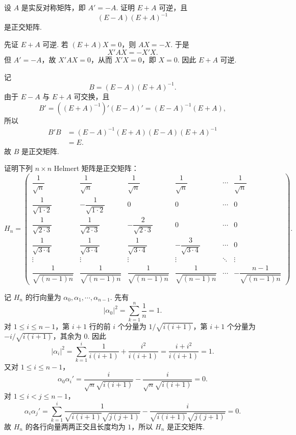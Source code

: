 \begin{problem}

	设 $A$ 是实反对称矩阵，即 $A'=-A$. 证明 $E+A$ 可逆，且
	\[
	(E-A)(E+A)^{-1}
	\]
	是正交矩阵.
\end{problem}
\begin{solution}
	先证 $E+A$ 可逆. 若 $(E+A)X=0$，则 $AX=-X$. 于是
	\[
	X'AX=-X'X.
	\]
	但 $A'=-A$，故 $X'AX=0$，从而 $X'X=0$，即 $X=0$. 因此 $E+A$ 可逆.
	
	记
	\[
	B=(E-A)(E+A)^{-1}.
	\]
	由于 $E-A$ 与 $E+A$ 可交换，且
	\[
	B'=\left((E+A)^{-1}\right)'(E-A)'=(E-A)^{-1}(E+A),
	\]
	所以
	\[
	\begin{aligned}
		B'B
		&=(E-A)^{-1}(E+A)(E-A)(E+A)^{-1} \\
		&=E.
	\end{aligned}
	\]
	故 $B$ 是正交矩阵.
\end{solution}

\begin{problem}

	证明下列 $n\times n$ Helmert 矩阵是正交矩阵：
	\[
	H_n=
	\begin{pmatrix}
		\dfrac1{\sqrt n} & \dfrac1{\sqrt n} & \dfrac1{\sqrt n} & \dfrac1{\sqrt n} & \cdots & \dfrac1{\sqrt n} \\
		\dfrac1{\sqrt{1\cdot2}} & -\dfrac1{\sqrt{1\cdot2}} & 0 & 0 & \cdots & 0 \\
		\dfrac1{\sqrt{2\cdot3}} & \dfrac1{\sqrt{2\cdot3}} & -\dfrac2{\sqrt{2\cdot3}} & 0 & \cdots & 0 \\
		\dfrac1{\sqrt{3\cdot4}} & \dfrac1{\sqrt{3\cdot4}} & \dfrac1{\sqrt{3\cdot4}} & -\dfrac3{\sqrt{3\cdot4}} & \cdots & 0 \\
		\vdots & \vdots & \vdots & \vdots & \ddots & \vdots \\
		\dfrac1{\sqrt{(n-1)n}} & \dfrac1{\sqrt{(n-1)n}} & \dfrac1{\sqrt{(n-1)n}} & \dfrac1{\sqrt{(n-1)n}} & \cdots & -\dfrac{n-1}{\sqrt{(n-1)n}}
	\end{pmatrix}.
	\]
\end{problem}
\begin{solution}
	记 $H_n$ 的行向量为 $\alpha_0,\alpha_1,\cdots,\alpha_{n-1}$. 先有
	\[
	|\alpha_0|^2=\sum_{k=1}^n\frac1n=1.
	\]
	对 $1\leqslant i\leqslant n-1$，第 $i+1$ 行的前 $i$ 个分量为 $1/\sqrt{i(i+1)}$，第 $i+1$ 个分量为 $-i/\sqrt{i(i+1)}$，其余为 $0$. 因此
	\[
	|\alpha_i|^2
	=\sum_{k=1}^{i}\frac1{i(i+1)}+\frac{i^2}{i(i+1)}
	=\frac{i+i^2}{i(i+1)}=1.
	\]
	又对 $1\leqslant i\leqslant n-1$，
	\[
	\alpha_0\alpha_i'
	=\frac{i}{\sqrt n\sqrt{i(i+1)}}-\frac{i}{\sqrt n\sqrt{i(i+1)}}=0.
	\]
	对 $1\leqslant i<j\leqslant n-1$，
	\[
	\alpha_i\alpha_j'
	=\sum_{k=1}^{i}\frac1{\sqrt{i(i+1)}\sqrt{j(j+1)}}
	-\frac{i}{\sqrt{i(i+1)}\sqrt{j(j+1)}}=0.
	\]
	故 $H_n$ 的各行向量两两正交且长度均为 $1$，所以 $H_n$ 是正交矩阵.
\end{solution}

